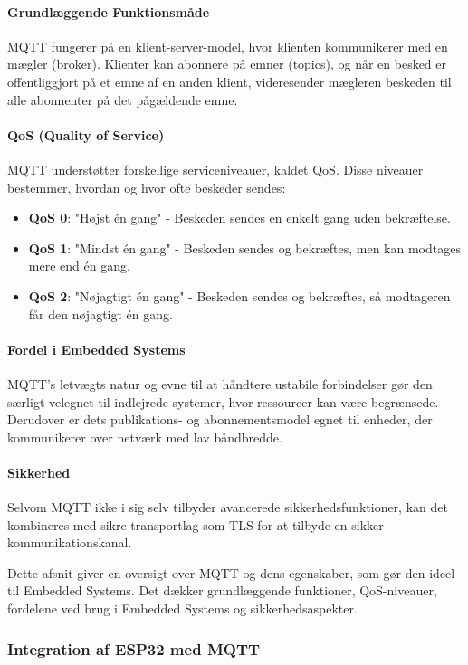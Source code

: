 \documentclass[12pt,a4paper]{book}
\begin{document}
	\paragraph{Grundlæggende Funktionsmåde}
	MQTT fungerer på en klient-server-model, hvor klienten kommunikerer med en mægler (broker). Klienter kan abonnere på emner (topics), og når en besked er offentliggjort på et emne af en anden klient, videresender mægleren beskeden til alle abonnenter på det pågældende emne.
	
	\paragraph{QoS (Quality of Service)}
	MQTT understøtter forskellige serviceniveauer, kaldet QoS. Disse niveauer bestemmer, hvordan og hvor ofte beskeder sendes:
	\begin{itemize}
		\item \textbf{QoS 0}: "Højst én gang" - Beskeden sendes en enkelt gang uden bekræftelse.
		\item \textbf{QoS 1}: "Mindst én gang" - Beskeden sendes og bekræftes, men kan modtages mere end én gang.
		\item \textbf{QoS 2}: "Nøjagtigt én gang" - Beskeden sendes og bekræftes, så modtageren får den nøjagtigt én gang.
	\end{itemize}
	
	\paragraph{Fordel i Embedded Systems}
	MQTT's letvægts natur og evne til at håndtere ustabile forbindelser gør den særligt velegnet til indlejrede systemer, hvor ressourcer kan være begrænsede. Derudover er dets publikations- og abonnementsmodel egnet til enheder, der kommunikerer over netværk med lav båndbredde.
	
	\paragraph{Sikkerhed}
	Selvom MQTT ikke i sig selv tilbyder avancerede sikkerhedsfunktioner, kan det kombineres med sikre transportlag som TLS for at tilbyde en sikker kommunikationskanal.
	
	Dette afsnit giver en oversigt over MQTT og dens egenskaber, som gør den ideel til Embedded Systems. Det dækker grundlæggende funktioner, QoS-niveauer, fordelene ved brug i Embedded Systems og sikkerhedsaspekter.
	
	\subsubsection{Integration af ESP32 med MQTT}
	
\end{document}

